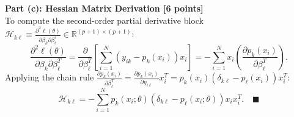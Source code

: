 \documentclass[11pt,a4paper]{article}
\begin{document}
\vspace{4pt}
\textbf{Part (c): Hessian Matrix Derivation [6 points]} \\
To compute the second-order partial derivative block $\mathcal{H}_{k\ell} \equiv \frac{\partial^2 \ell(\theta)}{\partial \beta_k \partial \beta_\ell^T} \in \mathbb{R}^{(p+1) \times (p+1)}$:
\[
  \frac{\partial^2 \ell(\theta)}{\partial \beta_k \partial \beta_\ell^T} = \frac{\partial}{\partial \beta_\ell^T} \left[ \sum_{i=1}^N (y_{ik} - p_k(x_i)) x_i \right] = -\sum_{i=1}^N x_i \left( \frac{\partial p_k(x_i)}{\partial \beta_\ell^T} \right).
\]
Applying the chain rule $\frac{\partial p_k(x_i)}{\partial \beta_\ell^T} = \frac{\partial p_k(x_i)}{\partial \eta_{i\ell}} x_i^T = p_k(x_i)(\delta_{k\ell} - p_\ell(x_i)) x_i^T$:
\[
  \mathcal{H}_{k\ell} = -\sum_{i=1}^N p_k(x_i; \theta) \left( \delta_{k\ell} - p_\ell(x_i; \theta) \right) x_i x_i^T. \quad \blacksquare
\]
\end{document}
